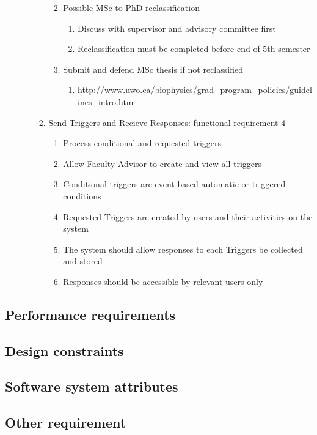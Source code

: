 \documentclass{journal}
\begin{document}
\begin{enumerate}
\begin{enumerate}
\begin{enumerate}
\begin{enumerate}
\begin{enumerate}
			\end{enumerate}
			\item Possible MSc to PhD reclassification
			\begin{enumerate}
			\item Discuss with supervisor and advisory committee first
			\item Reclassification must be completed before end of 5th semester
			\end{enumerate}
			\item Submit and defend MSc thesis if not reclassified
			\begin{enumerate}
			\item http://www.uwo.ca/biophysics/grad\_program\_policies/guidelines\_intro.htm
			\end{enumerate}
    \end{enumerate}
\item Send Triggers and Recieve Responses: functional requirement 4
\begin{enumerate}
\item Process conditional and requested triggers
\item Allow Faculty Advisor to create and view all triggers
\item Conditional triggers are event based automatic or triggered conditions
\item Requested Triggers are created by users and their activities on the system
\item The system should allow responses to each Triggers be collected and stored
\item Responses should be accessible by relevant users only 
\end{enumerate}
\end{enumerate}
\end{enumerate}
\end{enumerate}
\subsection{Performance requirements}

\subsection{Design constraints}
\subsection{Software system attributes}
\subsection{Other requirement}

\newpage

\end{document}

